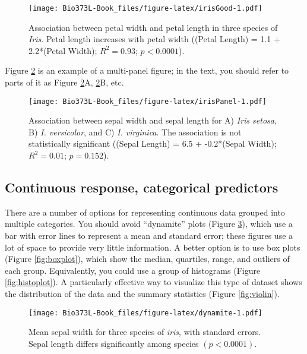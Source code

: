 \documentclass[]{book}
\begin{document}
\begin{figure}
\centering
\texttt{[image: Bio373L-Book\_files/figure-latex/irisGood-1.pdf]}
\caption{\label{fig:irisGood}Association between petal width and petal length in
three species of \emph{Iris}. Petal length increases with petal width
((Petal Length) = 1.1 + 2.2*(Petal Width); \(R^2 = 0.93\);
\(p<0.0001\)).}
\end{figure}

Figure \ref{fig:irisPanel} is an example of a multi-panel figure; in the
text, you should refer to parts of it as Figure \ref{fig:irisPanel}A,
\ref{fig:irisPanel}B, etc.






\begin{figure}
\centering
\texttt{[image: Bio373L-Book\_files/figure-latex/irisPanel-1.pdf]}
\caption{\label{fig:irisPanel}Association between sepal width and sepal length for
A) \emph{Iris setosa}, B) \emph{I. versicolor}, and C) \emph{I.
virginica}. The association is not statistically significant ((Sepal
Length) = 6.5 + -0.2*(Sepal Width); \(R^2 = 0.01\); \(p = 0.152\)).}
\end{figure}

\subsection{Continuous response, categorical
predictors}\label{continuous-response-categorical-predictors}

There are a number of options for representing continuous data grouped
into multiple categories. You should avoid ``dynamite'' plots (Figure
\ref{fig:dynamite}), which use a bar with error lines to represent a
mean and standard error; these figures use a lot of space to provide
very little information. A better option is to use box plots (Figure
\ref{fig:boxplot}), which show the median, quartiles, range, and
outliers of each group. Equivalently, you could use a group of
histograms (Figure \ref{fig:histoplot}). A particularly effective way to
visualize this type of dataset shows the distribution of the data and
the summary statistics (Figure \ref{fig:violin}).













\begin{figure}
\centering
\texttt{[image: Bio373L-Book\_files/figure-latex/dynamite-1.pdf]}
\caption{\label{fig:dynamite}Mean sepal width for three species of \emph{iris},
with standard errors. Sepal length differs significantly among species
\((p < 0.0001)\).}
\end{figure}
\end{document}
